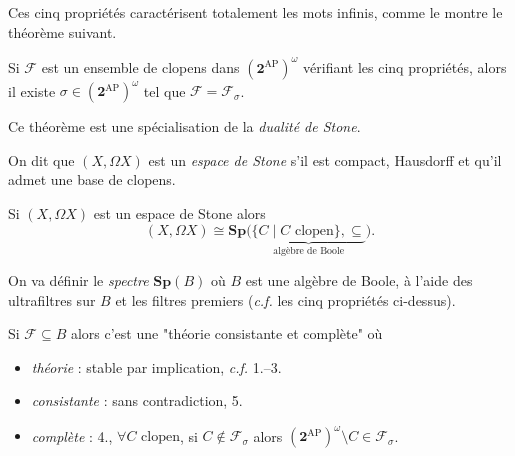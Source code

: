 \documentclass[./main]{subfiles}
\begin{document}
  Ces cinq propriétés caractérisent totalement les mots infinis, comme le montre le théorème suivant.

  \begin{thm}
    Si $\mathcal{F}$ est un ensemble de clopens dans $(\mathbf{2}^\mathrm{AP})^\omega$ vérifiant les cinq propriétés, alors il existe $\sigma \in (\mathbf{2}^\mathrm{AP})^\omega$ tel que $\mathcal{F} = \mathcal{F}_\sigma$.
  \end{thm}

  Ce théorème est une spécialisation de la \textit{dualité de Stone}.

  \begin{defn}
    On dit que $(X, \Omega X)$ est un \textit{espace de Stone} s'il est compact, Hausdorff et qu'il admet une base de clopens.
  \end{defn}

  \begin{thm}
    Si $(X, \Omega X)$ est un espace de Stone alors
    \[
      (X, \Omega X) \cong \mathbf{Sp}\big(\!\underbrace{\{C  \mid C \text{ clopen}\}, \subseteq}_{\text{algèbre de Boole}}\!\big)
    .\]
  \end{thm}

  On va définir le \textit{spectre} $\mathbf{Sp}(B)$ où $B$ est une algèbre de Boole, à l'aide des ultrafiltres sur $B$ et les filtres premiers (\textit{c.f.} les cinq propriétés ci-dessus).

  \begin{rmk}[Idée]
    Si $\mathcal{F} \subseteq B$ alors c'est une "théorie consistante et complète" où
    \begin{itemize}
      \item \textit{théorie} : stable par implication, \textit{c.f.} 1.--3.
      \item \textit{consistante} : sans contradiction, 5.
      \item \textit{complète} : 4., $\forall C \text{ clopen}$, si $C \not\in \mathcal{F}_\sigma$ alors $(\mathbf{2}^\mathrm{AP})^\omega \setminus C \in \mathcal{F}_\sigma$.
    \end{itemize}
  \end{rmk}
\end{document}
